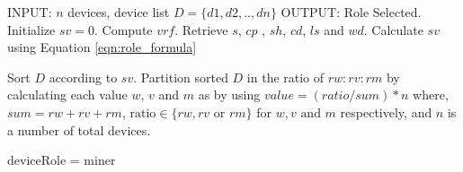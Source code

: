 \begin{algorithm}[!h]
  \caption{Proposed Device Role Selection Mechanism} \label{alg:role_mechanism}
  \begin{algorithmic}[1]
  \State INPUT: $n$ devices, device list $D = \{d1, d2, .. , dn\}$
  \State OUTPUT: Role Selected.
  \Procedure{\textcolor{blue}{preparation}}{}
      \State Initialize  $sv = 0$.
      \State Compute $vrf$.
      \State Retrieve $s$, $cp$ , $sh$, $cd$, $ls$ and $wd$. 
  \State  Calculate $sv$ using Equation \ref{eqn:role_formula}

  \State Sort $D$ according to $sv$.
  \State Partition sorted $D$ in the ratio of $rw:rv:rm$ by calculating each value $w$, $v$ and $m$  as by using 
  $value = (ratio / sum) * n $
    where, $sum = rw+rv+rm$, $ \text{ratio} \in \{rw, rv \text{ or } rm\}$ for $w,v \text{ and } m$ respectively, and $n$ is a number of total devices.

  \EndFor
  \EndProcedure

         \Else 
         \State deviceRole = miner
        \EndIf
    \EndFor
  \EndProcedure
  \end{algorithmic}
\end{algorithm}

